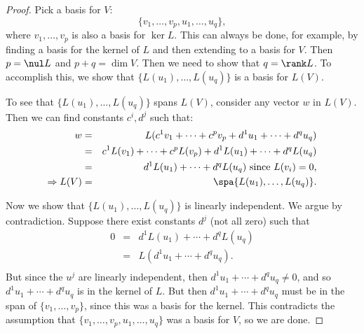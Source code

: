\begin{proof}
Pick a basis for $V$:
\[
\{ v_1,\ldots,v_p,u_1,\ldots, u_q \},
\]
where $v_1,\ldots,v_p$ is also a basis for $\ker L$.  This can always be done, for example, by finding a basis for the kernel of $L$ and then extending to a basis for $V$.  Then $p=\nul L$ and $p+q=\dim V$.  Then we need to show that $q=\rank L$.  To accomplish this, we show that 
$\{L(u_1),\ldots,L(u_q)\}$ is a basis for $L(V)$.

To see that $\{L(u_1),\ldots,L(u_q)\}$ spans $L(V)$, consider any vector $w$ in $L(V)$.  Then we can find constants $c^i, d^j$ such that:
\begin{eqnarray*}
w &=& L(c^1v_1 + \cdots + c^pv_p+d^1u_1 + \cdots + d^qu_q)\\
  &=& c^1L(v_1) + \cdots + c^pL(v_p)+d^1L(u_1)+\cdots+d^qL(u_q)\\
  &=& d^1L(u_1)+\cdots+d^qL(u_q) \text{ since $L(v_i)=0$,}\\
\Rightarrow L(V) &=& \spa \{L(u_1), \ldots, L(u_q)  \}.
\end{eqnarray*}

Now we show that $\{L(u_1),\ldots,L(u_q)\}$ is linearly independent.  We argue by contradiction. Suppose there exist constants $d^j$ (not all zero) such that
\begin{eqnarray*}
0 &=& d^1L(u_1)+\cdots+d^qL(u_q)\\
  &=& L(d^1u_1+\cdots+d^qu_q).\\
\end{eqnarray*}
But since the $u^j$ are linearly independent, then $d^1u_1+\cdots+d^qu_q\neq 0$, and so $d^1u_1+\cdots+d^qu_q$ is in the kernel of $L$.  But then $d^1u_1+\cdots+d^qu_q$ must be in the span of $\{v_1,\ldots, v_p\}$, since this was a basis for the kernel.  This contradicts the assumption that $\{ v_1,\ldots,v_p,u_1,\ldots, u_q \}$ was a basis for $V$, so we are done.
\end{proof}


